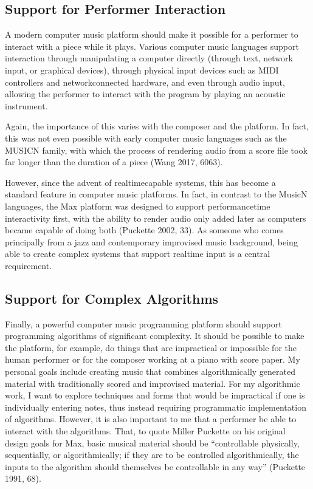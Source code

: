 \documentclass[letterpaper,10pt,english]{sphinxmanual}
\begin{document}
\subsection{Support for Performer Interaction}
\label{\detokenize{background:support-for-performer-interaction}}
\sphinxAtStartPar
A modern computer music platform should make it possible for a performer to interact with
a piece while it plays. Various computer music languages support interaction through
manipulating a computer directly (through text, network input, or graphical devices),
through physical input devices such as MIDI controllers and network\sphinxhyphen{}connected hardware,
and even through audio input, allowing the performer to interact with the program by playing
an acoustic instrument.

\sphinxAtStartPar
Again, the importance of this varies with the composer and the platform.
In fact, this was not even possible with early computer music languages such
as the MUSIC\sphinxhyphen{}N family, with which the process of rendering audio from a score file
took far longer than the duration of a piece (Wang 2017, 60\sphinxhyphen{}63).

\sphinxAtStartPar
However, since the advent of realtime\sphinxhyphen{}capable systems, this has become a
standard feature in computer music platforms.
In fact, in contrast to the Music\sphinxhyphen{}N languages, the Max platform was designed
to support performance\sphinxhyphen{}time interactivity first, with the ability to render audio only added later
as computers became capable of doing both (Puckette 2002, 33).
As someone who comes principally from a jazz and contemporary improvised music
background, being able to create complex systems that support realtime input is a
central requirement.


\subsection{Support for Complex Algorithms}
\label{\detokenize{background:support-for-complex-algorithms}}
\sphinxAtStartPar
Finally, a powerful computer music programming platform should support programming algorithms of significant complexity.
It should be possible to make the platform, for example, do things that are impractical
or impossible for the human performer or for the composer working at a piano with score paper.
My personal goals include creating music that combines algorithmically generated
material with traditionally scored and improvised material.
For my algorithmic work, I want to explore techniques and forms that would be impractical
if one is individually entering notes, thus instead requiring programmatic implementation of
algorithms.
However, it is also important to me that a performer be able to interact with the algorithms.
That, to quote Miller Puckette on his original design goals for Max,
basic musical material should be “controllable physically, sequentially, or algorithmically;
if they are to be controlled algorithmically, the inputs to the algorithm should
themselves be controllable in any way” (Puckette 1991, 68).
\end{document}
